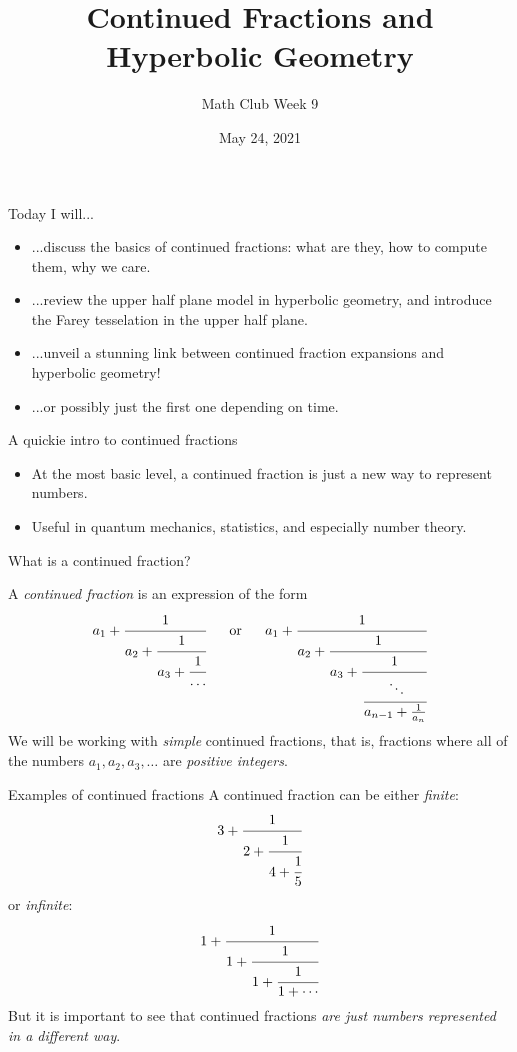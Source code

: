 \documentclass[serif]{beamer}
\title{Continued Fractions and Hyperbolic Geometry}
\author{Math Club Week 9}
\date{May 24, 2021}
\begin{document}
\frame{\titlepage}

\begin{frame}{Today I will...}
    \begin{itemize}
        \item ...discuss the basics of continued fractions: what are they, how to compute them, why we care.
        \item ...review the upper half plane model in hyperbolic geometry, and introduce the Farey tesselation in the upper half plane.
        \item ...unveil a stunning link between continued fraction expansions and hyperbolic geometry!
        \item ...or possibly just the first one depending on time.
    \end{itemize}
\end{frame}

\begin{frame}{A quickie intro to continued fractions}
    \begin{itemize}
        \item At the most basic level, a continued fraction is just a new way to represent numbers. 
        \item Useful in quantum mechanics, statistics, and especially number theory.
    \end{itemize}
\end{frame}

\begin{frame}{What is a continued fraction?}
    \begin{definition}
    A \emph{continued fraction} is an expression of the form 
    \[a_1+\cfrac{1}{a_2+\cfrac{1}{a_3+\cfrac{1}{\dots}}}\ \ \ \ \text{ or }\ \ \ \ a_1+\cfrac{1}{a_2+\cfrac{1}{a_3+\cfrac{1}{\cfrac{\ddots}{a_{n-1}+\frac{1}{a_n}}}}}
    \] We will be working with \emph{simple} continued fractions, that is, fractions where all of the numbers $a_1,a_2,a_3,\dots$ are \emph{positive integers}.
    \end{definition}
\end{frame}

\begin{frame}{Examples of continued fractions}
    A continued fraction can be either \emph{finite}:
    \[3 + \cfrac{1}{2 + \cfrac{1}{4+\cfrac{1}{5}}}
    \] or 
    \emph{infinite}:
    \[1 +\cfrac{1}{1+\cfrac{1}{1+\cfrac{1}{1+\cdots}}}
    \]
    But it is important to see that continued fractions \emph{are just numbers represented in a different way}.
\end{frame}
\end{document}
